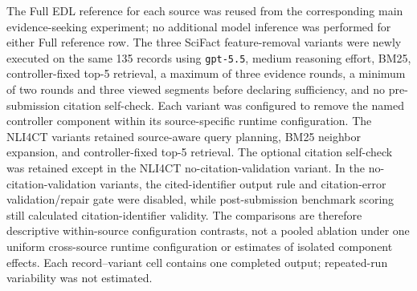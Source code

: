 \documentclass[
  8pt,
]{extarticle}
\begin{document}
The Full EDL reference for each source was reused from the corresponding
main evidence-seeking experiment; no additional model inference was
performed for either Full reference row. The three SciFact
feature-removal variants were newly executed on the same 135 records
using \texttt{gpt-5.5}, medium reasoning effort, BM25, controller-fixed
top-5 retrieval, a maximum of three evidence rounds, a minimum of two
rounds and three viewed segments before declaring sufficiency, and no
pre-submission citation self-check. Each variant was configured to
remove the named controller component within its source-specific runtime
configuration. The NLI4CT variants retained source-aware query planning,
BM25 neighbor expansion, and controller-fixed top-5 retrieval. The
optional citation self-check was retained except in the NLI4CT
no-citation-validation variant. In the no-citation-validation variants,
the cited-identifier output rule and citation-error validation/repair
gate were disabled, while post-submission benchmark scoring still
calculated citation-identifier validity. The comparisons are therefore
descriptive within-source configuration contrasts, not a pooled
ablation under one uniform cross-source runtime configuration or
estimates of isolated component effects. Each record--variant cell
contains one completed output; repeated-run variability was not
estimated.
\end{document}
